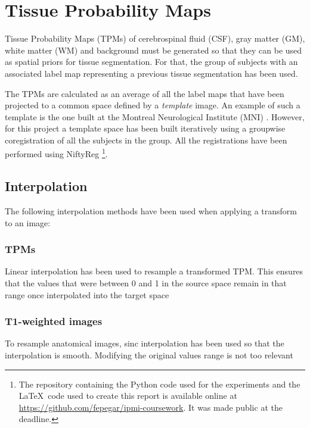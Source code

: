 \section{Tissue Probability Maps}



Tissue Probability Maps (TPMs) of cerebrospinal fluid (CSF), gray matter (GM), white matter (WM) and background must be generated so that they can be used as spatial priors for tissue segmentation. For that, the group of subjects with an associated label map representing a previous tissue segmentation has been used.


The TPMs are calculated as an average of all the label maps that have been projected to a common space defined by a \textit{template} image. An example of such a template is the one built at the Montreal Neurological Institute (MNI) \cite{evans_3d_1993}. However, for this project a template space has been built iteratively using a groupwise coregistration of all the subjects in the group. All the registrations have been performed using NiftyReg \cite{modat_global_2014}\footnote{The repository containing the Python code used for the experiments and the \LaTeX\ code used to create this report is available online at \href{https://github.com/fepegar/ipmi-coursework}{https://github.com/fepegar/ipmi-coursework}. It was made public at the deadline.}.


\subsection{Interpolation}
The following interpolation methods have been used when applying a transform to an image:

\subsubsection{TPMs}
Linear interpolation has been used to resample a transformed TPM. This ensures that the values that were between 0 and 1 in the source space remain in that range once interpolated into the target space

\subsubsection{T1-weighted images} To resample anatomical images, sinc interpolation has been used so that the interpolation is smooth. Modifying the original values range is not too relevant

